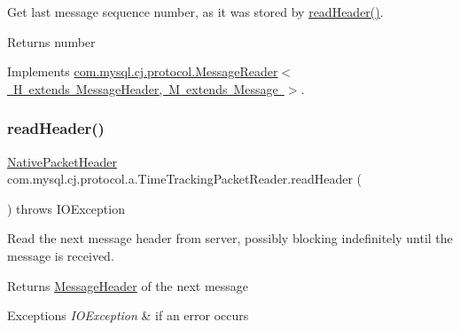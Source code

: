 Get last message sequence number, as it was stored by \mbox{\hyperlink{classcom_1_1mysql_1_1cj_1_1protocol_1_1a_1_1_time_tracking_packet_reader_aa49a24bf628c8b096b222c6516cb04b3}{read\+Header()}}.

\begin{DoxyReturn}{Returns}
number 
\end{DoxyReturn}


Implements \mbox{\hyperlink{interfacecom_1_1mysql_1_1cj_1_1protocol_1_1_message_reader_ac4a36fb287c5308dd3d7e6157ef4e237}{com.\+mysql.\+cj.\+protocol.\+Message\+Reader$<$ H extends Message\+Header, M extends Message $>$}}.

\mbox{\label{classcom_1_1mysql_1_1cj_1_1protocol_1_1a_1_1_time_tracking_packet_reader_aa49a24bf628c8b096b222c6516cb04b3}} 
\subsubsection{\texorpdfstring{read\+Header()}{readHeader()}}
{\footnotesize\ttfamily \mbox{\hyperlink{classcom_1_1mysql_1_1cj_1_1protocol_1_1a_1_1_native_packet_header}{Native\+Packet\+Header}} com.\+mysql.\+cj.\+protocol.\+a.\+Time\+Tracking\+Packet\+Reader.\+read\+Header (\begin{DoxyParamCaption}{ }\end{DoxyParamCaption}) throws I\+O\+Exception}

Read the next message header from server, possibly blocking indefinitely until the message is received.

\begin{DoxyReturn}{Returns}
\mbox{\hyperlink{interfacecom_1_1mysql_1_1cj_1_1protocol_1_1_message_header}{Message\+Header}} of the next message 
\end{DoxyReturn}

\begin{DoxyExceptions}{Exceptions}
{\em I\+O\+Exception} & if an error occurs \\
\hline
\end{DoxyExceptions}


